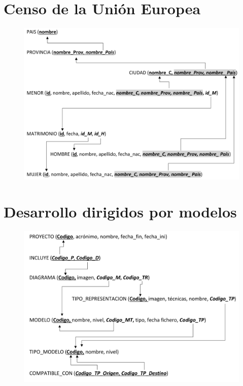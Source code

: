 \documentclass[a4paper]{article}
\begin{document}
\section{Censo de la Unión Europea}

\begin{figure}[H]
    \includegraphics[width=\textwidth]{figs/censo-union-europea-sol}
\end{figure}

\section{Desarrollo dirigidos por modelos}

\begin{figure}[H]
    \includegraphics[width=\textwidth]{figs/desarrollo-dirigido-por-modelos-sol}
\end{figure}
\end{document}
